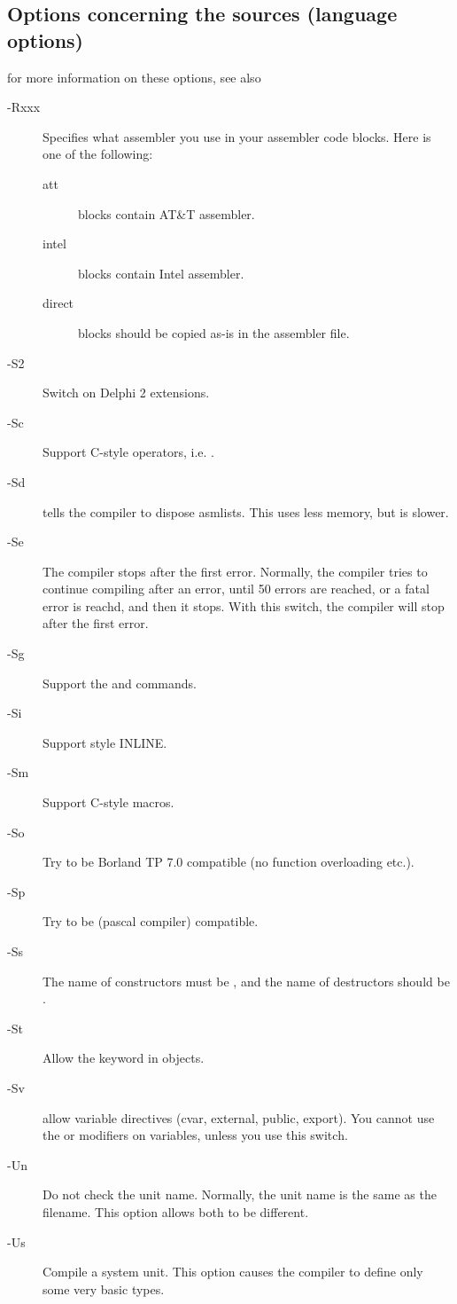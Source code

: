 \documentclass{report}
\newcommand{\olabel}[1]{\label{option:#1}}
\begin{document}
\subsection{Options concerning the sources (language options)}
for more information on these options, see also \progref
\begin{description}
\item [-Rxxx] \olabel{R} Specifies what assembler you use in your  assembler code
blocks. Here  is one of the following:
\begin{description}
\item [att\ ]  blocks contain AT\&T assembler.
\item [intel]  blocks contain Intel assembler.
\item [direct]  blocks should be copied as-is in the assembler
file.   
\end{description}
\item [-S2] \olabel{Stwo} Switch on Delphi 2 extensions.
\item [-Sc] \olabel{Sc} Support C-style operators, i.e. .
\item [-Sd] tells the compiler to dispose asmlists. This uses less memory,
but is slower.
\item [-Se] \olabel{Se} The compiler stops after the first error. Normally,
the compiler tries to continue compiling after an error, until 50 errors are
reached, or a fatal error is reachd, and then it stops. With this switch,
the compiler will stop after the first error.
\item [-Sg] \olabel{Sg} Support the  and  commands.
\item [-Si] \olabel{Si} Support  style INLINE.
\item [-Sm] \olabel{Sm} Support C-style macros.
\item [-So] \olabel{So} Try to be Borland TP 7.0 compatible (no function
overloading etc.).
\item [-Sp] \olabel{Sp} Try to be  (\gnu pascal compiler)
compatible.
\item [-Ss] \olabel{Ss} The name of constructors must be , and the
name of destructors should be .
\item [-St] \olabel{St} Allow the  keyword in objects.
\item [-Sv] allow variable directives (cvar, external, public, export).
You cannot use the  or  modifiers on variables,
unless you use this switch.
\item [-Un] \olabel{Un} Do not check the unit name. Normally, the unit name
is the same as the filename. This option allows both to be different.
\item [-Us] \olabel{Us} Compile a system unit. This option causes the
compiler to define only some very basic types.
\end{description}
\end{document}
